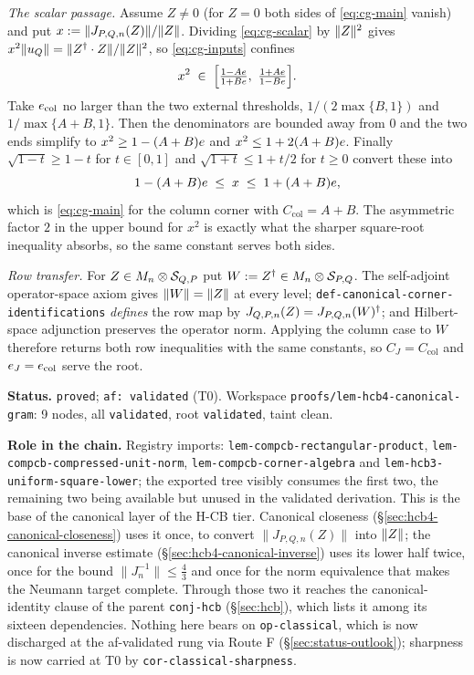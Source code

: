 \emph{The scalar passage.} Assume $Z\ne0$ (for $Z=0$ both sides of \eqref{eq:cg-main}
vanish) and put $x:=\lVert J_{P,Q,n}(Z)\rVert/\lVert Z\rVert$. Dividing \eqref{eq:cg-scalar} by
$\lVert Z\rVert^{2}$ gives $x^{2}\lVert u_{Q}\rVert=\lVert Z^{\dagger}\mathbin{\cdot} Z\rVert/\lVert Z\rVert^{2}$, so
\eqref{eq:cg-inputs} confines
\[
  x^{2}\;\in\;\Bigl[\tfrac{1-A\comb}{1+B\comb},\ \tfrac{1+A\comb}{1-B\comb}\Bigr].
\]
Take $e_{\mathrm{col}}$ no larger than the two external thresholds, $1/(2\max\{B,1\})$
and $1/\max\{A+B,1\}$. Then the denominators are bounded away from $0$ and the two ends
simplify to $x^{2}\ge1-(A+B)e$ and $x^{2}\le1+2(A+B)e$. Finally
$\sqrt{1-t}\ge1-t$ for $t\in[0,1]$ and $\sqrt{1+t}\le1+t/2$ for $t\ge0$ convert these into
\begin{equation}\label{eq:cg-col}
  1-(A+B)e\;\le\;x\;\le\;1+(A+B)e,
\end{equation}
which is \eqref{eq:cg-main} for the column corner with $C_{\mathrm{col}}=A+B$. The
asymmetric factor $2$ in the upper bound for $x^{2}$ is exactly what the sharper
square-root inequality absorbs, so the same constant serves both sides.

\emph{Row transfer.} For $Z\in M_{n}\otimes \mathcal S_{Q,P}$ put $W:=Z^{\dagger}\in M_{n}\otimes \mathcal S_{P,Q}$.
The self-adjoint operator-space axiom gives $\lVert W\rVert=\lVert Z\rVert$ at every level;
\texttt{def-canonical-corner-identifications} \emph{defines} the row map by
$J_{Q,P,n}(Z)=J_{P,Q,n}(W)^{\dagger}$; and Hilbert-space adjunction preserves the operator norm.
Applying the column case to $W$ therefore returns both row inequalities with the same
constants, so $C_J=C_{\mathrm{col}}$ and $e_J=e_{\mathrm{col}}$ serve the root.

\medskip
\noindent\textbf{Status.} \texttt{proved}; \texttt{af: validated} (T0). Workspace
\texttt{proofs/lem-hcb4-canonical-gram}: 9 nodes, all \texttt{validated}, root
\texttt{validated}, taint clean.

\noindent\textbf{Role in the chain.} Registry imports:
\texttt{lem-compcb-rectangular-product},
\texttt{lem-compcb-compressed-unit-norm},
\texttt{lem-compcb-corner-algebra} and
\texttt{lem-hcb3-uniform-square-lower}; the exported tree visibly consumes the first two,
the remaining two being available but unused in the validated derivation. This is the base
of the canonical layer of the H-CB tier. Canonical closeness
(\S\ref{sec:hcb4-canonical-closeness}) uses it once, to convert
$\lVert J_{P,Q,n}(Z)\rVert$ into $\lVert Z\rVert$; the canonical inverse estimate
(\S\ref{sec:hcb4-canonical-inverse}) uses its lower half twice, once for the bound
$\lVert J_n^{-1}\rVert\le\tfrac43$ and once for the norm equivalence that makes the
Neumann target complete. Through those two it reaches the canonical-identity clause of the
parent \texttt{conj-hcb} (\S\ref{sec:hcb}), which lists it among its sixteen dependencies.
Nothing here bears on \texttt{op-classical}, which is now discharged at the af-validated rung via Route F (\S\ref{sec:status-outlook}); sharpness is now carried at T0 by \texttt{cor-classical-sharpness}.
